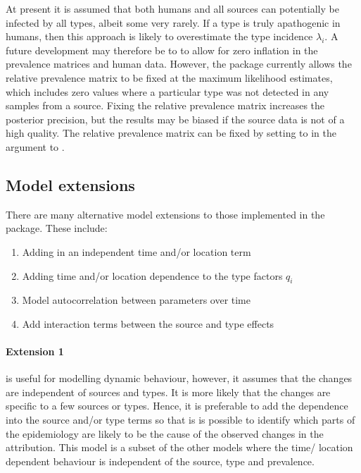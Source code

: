 At present it is assumed that both humans and all sources can potentially be infected by all types, albeit some very rarely. If a 
type is truly apathogenic in humans, then this approach is likely to overestimate the type incidence $\lambda_i$.  A future development may therefore be to to allow for zero inflation in the prevalence matrices and human data. However, the  package currently allows the relative prevalence matrix to be fixed at the maximum 
likelihood estimates, which includes zero values where a particular type was not detected in any samples from a source.  Fixing the relative prevalence matrix increases the posterior precision, but 
the results may be biased if the source data is not of a high quality. The relative prevalence matrix can be fixed by setting  to  in the  argument to 
. 

\subsection{Model extensions}
There are many alternative model extensions to those implemented in the  package. These include:

\begin{enumerate}
\item Adding in an independent time and/or location term
\item Adding time and/or location dependence to the type factors $q_{i}$
\item Model autocorrelation between parameters over time
\item Add interaction terms between the source and type effects
\end{enumerate}

\paragraph{Extension 1} is useful for modelling dynamic behaviour, however, it assumes that the changes are independent of sources and types. It is more likely that the changes are specific to a few 
sources or types. Hence, it is preferable to add the dependence into the source and/or type terms so that is is possible to identify which parts of the epidemiology are likely to be the cause of the 
observed changes in the attribution. This model is a subset of the other models where the time/ location dependent behaviour is independent of the source, type and prevalence.

